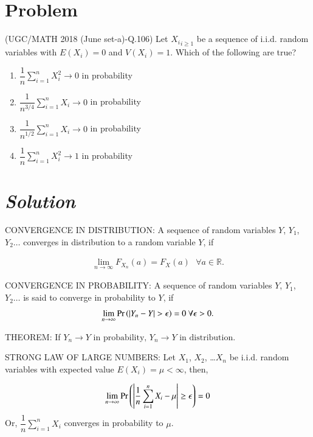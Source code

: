 \documentclass[journal,12pt,twocolumn]{IEEEtran}
\begin{document}
\section{Problem}
(UGC/MATH 2018 (June set-a)-Q.106) Let ${X_i}_{i \geq 1}$ be a sequence of i.i.d. random variables with $E(X_i)=0$ and $V(X_i)=1$. Which of the following are true?
\vspace{0.2cm}
\begin{enumerate}
    \item $\dfrac{1}{n} \sum_{i=1}^n X_i^2 \to 0$ in probability 
    \item $\dfrac{1}{n^{3/4}} \sum_{i=1}^n X_i \to 0$ in probability 
    \item $\dfrac{1}{n^{1/2}} \sum_{i=1}^n X_i \to 0$ in probability 
    \item $\dfrac{1}{n} \sum_{i=1}^n X_i^2 \to 1$ in probability
\end{enumerate}

\section{\emph{Solution}}
CONVERGENCE IN DISTRIBUTION:
A sequence of random variables $Y$, $Y_1$, $Y_2 \ldots$   converges in distribution to a random variable $Y$, if

\begin{align}
    \lim_{n \to \infty}F_{X_{n}} (a) = F_{X} (a)  \text{  }\forall a \in \mathbb{R}.
\end{align}

CONVERGENCE IN PROBABILITY:
A sequence of random variables $Y$, $Y_1$, $Y_2 \ldots$ is said to converge in probability to $Y$, if
\begin{align}
    \lim_{n \to \infty}\Pr\left(\vert Y_n - Y\vert > \epsilon\right) = 0  \text{  }\forall \epsilon > 0.
\end{align}




THEOREM: 
If
\begin{math}
 {Y_n} \to Y \text{ in probability, }{Y_n} \to Y \text{ in distribution.}
\end{math}

STRONG LAW OF LARGE NUMBERS: 
Let $X_1$, $X_2$, \ldots $X_n$ be i.i.d. random variables with expected value $E(X_i)=\mu < \infty$, then,

\begin{align}
    \lim_{n \to \infty}\Pr\left(\left|\dfrac{1}{n}\sum_{i=1}^n X_i - \mu \right|\geq \epsilon\right)=0
\end{align}
Or, 
\begin{math}
    \dfrac{1}{n}\sum_{i=1}^n X_i
\end{math}
converges in probability to $\mu$.
\end{document}

